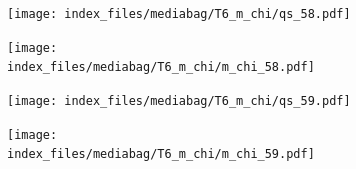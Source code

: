 \documentclass[
  11pt,
  letterpaper,
]{scrreprt}
\begin{document}
\begin{figure}

\begin{minipage}{0.50\linewidth}

\begin{figure}[H]

{\centering \texttt{[image: index\_files/mediabag/T6\_m\_chi/qs\_58.pdf]}

}


\end{figure}%

\end{minipage}%
%
\begin{minipage}{0.50\linewidth}

\begin{figure}[H]

{\centering \texttt{[image: index\_files/mediabag/T6\_m\_chi/m\_chi\_58.pdf]}

}


\end{figure}%

\end{minipage}%

\end{figure}%

\begin{figure}

\begin{minipage}{0.50\linewidth}

\begin{figure}[H]

{\centering \texttt{[image: index\_files/mediabag/T6\_m\_chi/qs\_59.pdf]}

}


\end{figure}%

\end{minipage}%
%
\begin{minipage}{0.50\linewidth}

\begin{figure}[H]

{\centering \texttt{[image: index\_files/mediabag/T6\_m\_chi/m\_chi\_59.pdf]}

}


\end{figure}%

\end{minipage}%

\end{figure}%
\end{document}
